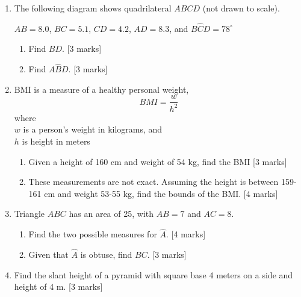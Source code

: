 \documentclass[12pt, twoside]{article}
\begin{document}
\begin{enumerate}
\item The following diagram shows quadrilateral $ABCD$ (not drawn to scale).
  \begin{center}
    \end{center} 
    $AB=8.0$, $BC=5.1$, $CD=4.2$, $AD=8.3$, and $B\hat{C}D=78^\circ$
    \begin{enumerate}
      \item Find $BD$. \hfill [3 marks]
      \item Find $A\hat{B}D$. \hfill [3 marks]
    \end{enumerate}

\item BMI is a measure of a healthy personal weight, 
  \[\displaystyle BMI = \frac{w}{h^2}\]
    where \\
    $w$ is a person's weight in kilograms, and \\
    $h$ is height in meters
    \begin{enumerate} 
        \item Given a height of 160 cm and weight of 54 kg, find the BMI  \hfill [3 marks]
        \item These measurements are not exact. Assuming the height is between 159-161 cm and weight 53-55 kg, find the bounds of the BMI.  \hfill [4 marks]
      \end{enumerate}


\item Triangle $ABC$ has an area of 25, with $AB=7$ and $AC=8$. 
   \begin{enumerate}
     \item Find the two possible measures for $\hat{A}$. \hfill [4 marks]
     \item Given that $\hat{A}$ is obtuse, find $BC$. \hfill [3 marks]
   \end{enumerate}

\item Find the slant height of a pyramid with square base 4 meters on a side and height of 4 m. \hfill [3 marks]
    
\end{enumerate}
\end{document}
